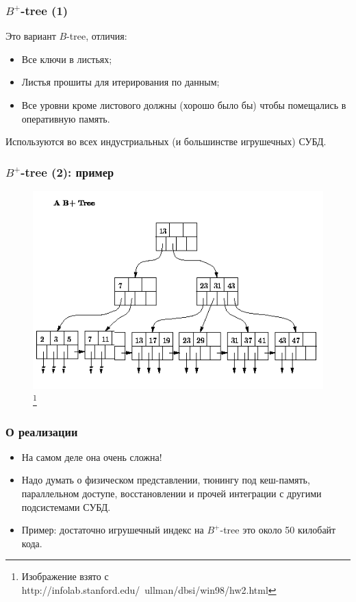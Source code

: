 \documentclass{beamer}
\begin{document}
\begin{frame}
\frametitle{$B^{+}$-tree (1)}

Это вариант $B$-tree, отличия:

\begin{itemize}
  \setlength\itemsep{1em}
  \item Все ключи в листьях;
  \item Листья прошиты для итерирования по данным;
  \item Все уровни кроме листового должны (хорошо было бы) чтобы помещались в оперативную память.
\end{itemize}
Используются во всех индустриальных (и большинстве игрушечных) СУБД.
\end{frame}

\begin{frame}
\frametitle{$B^{+}$-tree (2): пример}

\begin{figure}[htb]
\includegraphics[width=\textwidth,height=0.75\textheight,keepaspectratio]{B-tree.png}\footnote{\tiny{Изображение взято с http://infolab.stanford.edu/~ullman/dbsi/win98/hw2.html}}
\end{figure}

\end{frame}

\begin{frame}
\frametitle{О реализации}
\begin{itemize}
  \setlength\itemsep{1em}
  \item На самом деле она очень сложна!
  \item Надо думать о физическом представлении, тюнингу под кеш-память, параллельном доступе, восстановлении и прочей интеграции с другими подсистемами СУБД.
  \item Пример: достаточно игрушечный индекс на $B^{+}$-tree это около 50 килобайт кода.
\end{itemize}
\end{frame}
\end{document}
